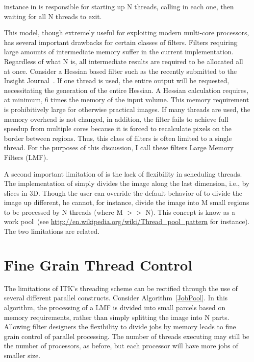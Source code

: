\documentclass{InsightArticle}
\begin{document}
 instance in  is responsible for starting up N threads, calling  in each one, then waiting for all N threads to exit.

This model, though extremely useful for exploiting modern multi-core processors, has several important drawbacks for certain classes of filters.  Filters requiring large amounts of intermediate memory suffer in the current implementation.  Regardless of what N is, all intermediate results are required to be allocated all at once.  Consider a Hessian based filter such as the  recently submitted to the Insight Journal~\cite{Antiga2007}.  If one thread is used, the entire output will be requested, necessitating the generation of the entire Hessian.  A Hessian calculation requires, at minimum, 6 times the memory of the input volume.  This memory requirement is prohibitively large for otherwise practical images.  If many threads are used, the memory overhead is not changed, in addition, the filter fails to achieve full speedup from multiple cores because it is forced to recalculate pixels on the border between regions.  Thus, this class of filters is often limited to a single thread.  For the purposes of this discussion, I call these filters Large Memory Filters (LMF).

A second important limitation of  is the lack of flexibility in scheduling threads.  The implementation of  simply divides the image along the last dimension, i.e., by slices in 3D.  Though the user can override the default behavior of  to divide the image up different, he cannot, for instance, divide the image into M small regions to be processed by N threads (where M $>>$ N).  This concept is know as a work pool~(see \url{http://en.wikipedia.org/wiki/Thread_pool_pattern} for instance).  The two limitations are related.

\section{Fine Grain Thread Control}
The limitations of ITK's threading scheme can be rectified through the use of several different parallel constructs.  Consider Algorithm~\ref{JobPool}.  In this algorithm, the processing of a LMF is divided into small parcels based on memory requirements, rather than simply splitting the image into N parts.  Allowing filter designers the flexibility to divide jobs by memory leads to fine grain control of parallel processing.  The number of threads executing may still be the number of processors, as before, but each processor will have more jobs of smaller size.
\end{document}
